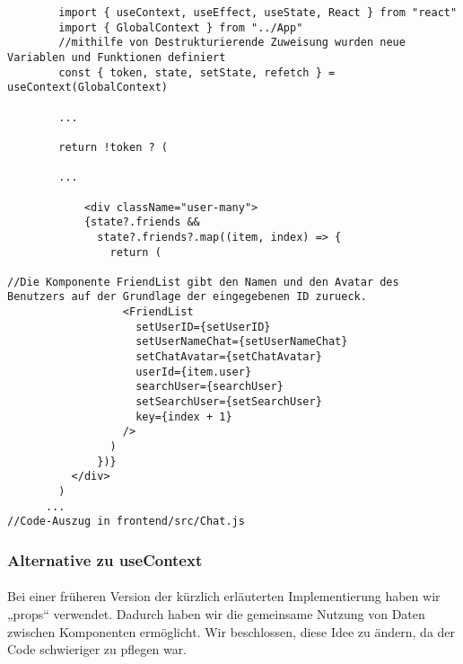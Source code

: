     \begin{lstlisting}
        import { useContext, useEffect, useState, React } from "react"
        import { GlobalContext } from "../App"
        //mithilfe von Destrukturierende Zuweisung wurden neue Variablen und Funktionen definiert
        const { token, state, setState, refetch } = useContext(GlobalContext)

        ...

        return !token ? (

        ...

            <div className="user-many">
            {state?.friends &&
              state?.friends?.map((item, index) => {
                return (

//Die Komponente FriendList gibt den Namen und den Avatar des Benutzers auf der Grundlage der eingegebenen ID zurueck.
                  <FriendList
                    setUserID={setUserID}
                    setUserNameChat={setUserNameChat}
                    setChatAvatar={setChatAvatar}
                    userId={item.user}
                    searchUser={searchUser}
                    setSearchUser={setSearchUser}
                    key={index + 1}
                  />
                )
              })}
          </div>
        )
      ...
//Code-Auszug in frontend/src/Chat.js
    \end{lstlisting}

\subsubsection{Alternative zu useContext}
\paragraph{}
Bei einer früheren Version der kürzlich erläuterten Implementierung haben wir  „props“ verwendet. Dadurch haben wir die gemeinsame Nutzung von Daten zwischen Komponenten ermöglicht. Wir beschlossen, diese Idee zu ändern, da der Code schwieriger zu pflegen war.
\\

